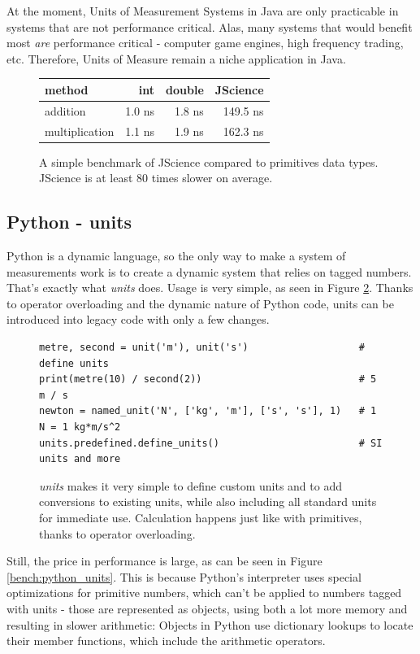 \documentclass[12pt,oneside,a4paper]{scrbook}
\begin{document}
At the moment, Units of Measurement Systems in Java are only practicable in systems that are not performance critical. Alas, many systems that would benefit most \emph{are} performance critical - computer game engines, high frequency trading, etc. Therefore, Units of Measure remain a niche application in Java.

\begin{figure}
\begin{tabular}{lrrr}
method          & int    & double  & JScience \\
\midrule
addition        & 1.0 ns &  1.8 ns    &   149.5 ns \\
multiplication  & 1.1 ns &  1.9 ns    &   162.3 ns
\end{tabular}
\caption{A simple benchmark of JScience compared to primitives data types. JScience is at least 80 times slower on average.}
\label{bench:jscience}
\end{figure}


\subsection{Python - units}

Python is a dynamic language, so the only way to make a system of measurements work is to create a dynamic system that relies on tagged numbers. That's exactly what \emph{units} \citep{Donohue12} does. Usage is very simple, as seen in Figure \ref{code:python_units}. Thanks to operator overloading and the dynamic nature of Python code, units can be introduced into legacy code with only a few changes.

\begin{figure}
\begin{verbatim}
metre, second = unit('m'), unit('s')                   # define units
print(metre(10) / second(2))                           # 5 m / s
newton = named_unit('N', ['kg', 'm'], ['s', 's'], 1)   # 1 N = 1 kg*m/s^2
units.predefined.define_units()                        # SI units and more
\end{verbatim}
\caption{\emph{units} makes it very simple to define custom units and to add conversions to existing units, while also including all standard units for immediate use. Calculation happens just like with primitives, thanks to operator overloading.}
\label{code:python_units}
\end{figure}

Still, the price in performance is large, as can be seen in Figure \ref{bench:python_units}. This is because Python's interpreter uses special optimizations for primitive numbers, which can't be applied to numbers tagged with units - those are represented as objects, using both a lot more memory and resulting in slower arithmetic: Objects in Python use dictionary lookups to locate their member functions, which include the arithmetic operators.
\end{document}
